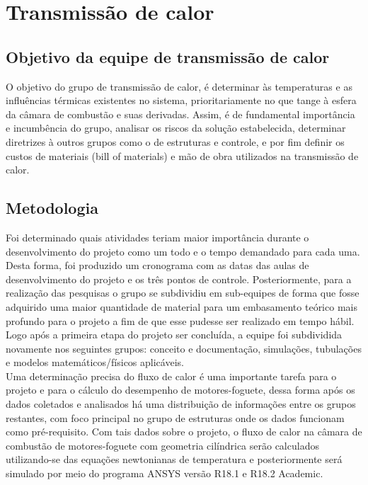 
\section{Transmissão de calor}

\subsection{Objetivo da equipe de transmissão de calor}
O objetivo do grupo de transmissão de calor, é determinar às temperaturas e as influências térmicas existentes no sistema, prioritariamente no que tange à esfera da câmara de combustão e suas derivadas. Assim, é de fundamental importância e incumbência do grupo, analisar os riscos da solução estabelecida, determinar diretrizes à outros grupos como o de estruturas e controle, e por fim definir os custos de materiais (bill of materials) e mão de obra utilizados na transmissão de calor.
\subsection{Metodologia}
Foi determinado quais atividades teriam maior importância durante o desenvolvimento do projeto como um todo e o tempo demandado para cada uma. Desta forma, foi produzido um cronograma com as datas das aulas de desenvolvimento do projeto e os três pontos de controle. Posteriormente, para a realização das pesquisas o grupo se subdividiu em sub-equipes de forma que fosse adquirido uma maior quantidade de material para um embasamento teórico mais profundo para o projeto a fim de que esse pudesse ser realizado em tempo hábil. Logo após a primeira etapa do projeto ser concluída, a equipe foi subdividida novamente nos seguintes grupos: conceito e documentação, simulações, tubulações e modelos matemáticos/físicos aplicáveis.\\
Uma determinação precisa do fluxo de calor é uma importante tarefa para o projeto e para o cálculo do desempenho de motores-foguete, dessa forma após os dados coletados e analisados há uma distribuição de informações entre os grupos restantes, com foco principal no grupo de estruturas onde os dados funcionam como pré-requisito. Com tais dados sobre o projeto, o fluxo de calor na câmara de combustão de motores-foguete com geometria cilíndrica serão calculados utilizando-se das equações newtonianas de temperatura e posteriormente será simulado por meio do programa ANSYS versão R18.1 e  R18.2 Academic. 
